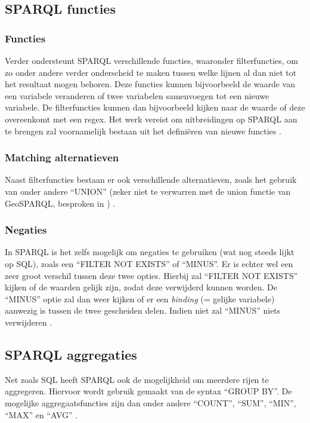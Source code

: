 \subsection{SPARQL functies}
\subsubsection{Functies}
Verder ondersteunt SPARQL verschillende functies, waaronder filterfuncties, om zo onder andere verder onderscheid te maken tussen welke lijnen al dan niet tot het resultaat mogen behoren. Deze functies kunnen bijvoorbeeld de waarde van een variabele veranderen of twee variabelen samenvoegen tot een nieuwe variabele. De filterfuncties kunnen dan bijvoorbeeld kijken naar de waarde of deze overeenkomt met een regex. Het werk vereist om uitbreidingen op SPARQL aan te brengen zal voornamelijk bestaan uit het definiëren van nieuwe functies \cite{sparql2013querylanguage}.

\subsubsection{Matching alternatieven}
Naast filterfuncties bestaan er ook verschillende alternatieven, zoals het gebruik van onder andere ``UNION'' (zeker niet te verwarren met de union functie van GeoSPARQL, besproken in ) \cite{sparql2013querylanguage}.

\subsubsection{Negaties}
In SPARQL is het zelfs mogelijk om negaties te gebruiken (wat nog steeds lijkt op SQL), zoals een ``FILTER NOT EXISTS'' of ``MINUS''. Er is echter wel een zeer groot verschil tussen deze twee opties. Hierbij zal ``FILTER NOT EXISTS'' kijken of de waarden gelijk zijn, zodat deze verwijderd kunnen worden. De ``MINUS'' optie zal dan weer kijken of er een \textit{binding} (= gelijke variabele) aanwezig is tussen de twee gescheiden delen. Indien niet zal ``MINUS'' niets verwijderen \cite{sparql2013querylanguage}.

\subsection{SPARQL aggregaties}
Net zoals SQL heeft SPARQL ook de mogelijkheid om meerdere rijen te aggregeren. Hiervoor wordt gebruik gemaakt van de syntax ``GROUP BY''. De mogelijke aggregaatsfuncties zijn dan onder andere ``COUNT'', ``SUM'', ``MIN'', ``MAX'' en ``AVG'' \cite{sparql2013querylanguage}.

